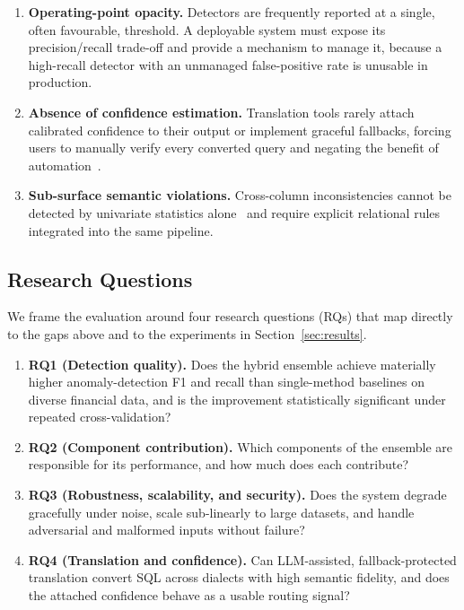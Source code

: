 \documentclass{ieeeaccess}
\begin{document}
\begin{enumerate}
\item \textbf{Operating-point opacity.} Detectors are frequently reported at a single, often favourable, threshold. A
deployable system must expose its precision/recall trade-off and provide a mechanism to manage it, because a high-recall
detector with an unmanaged false-positive rate is unusable in production.
\item \textbf{Absence of confidence estimation.} Translation tools rarely attach calibrated confidence to their output or
implement graceful fallbacks, forcing users to manually verify every converted query and negating the benefit of
automation~\cite{sculley2015hidden}.
\item \textbf{Sub-surface semantic violations.} Cross-column inconsistencies cannot be detected by univariate statistics
alone~\cite{motro1989integrity} and require explicit relational rules integrated into the same pipeline.
\end{enumerate}

\subsection{Research Questions}
\label{subsec:rqs}
We frame the evaluation around four research questions (RQs) that map directly to the gaps above and to the experiments
in Section~\ref{sec:results}.

\begin{enumerate}
\item \textbf{RQ1 (Detection quality).} Does the hybrid ensemble achieve materially higher anomaly-detection F1 and recall
than single-method baselines on diverse financial data, and is the improvement statistically significant under repeated
cross-validation?
\item \textbf{RQ2 (Component contribution).} Which components of the ensemble are responsible for its performance, and how
much does each contribute?
\item \textbf{RQ3 (Robustness, scalability, and security).} Does the system degrade gracefully under noise, scale
sub-linearly to large datasets, and handle adversarial and malformed inputs without failure?
\item \textbf{RQ4 (Translation and confidence).} Can LLM-assisted, fallback-protected translation convert SQL across
dialects with high semantic fidelity, and does the attached confidence behave as a usable routing signal?
\end{enumerate}
\end{document}
